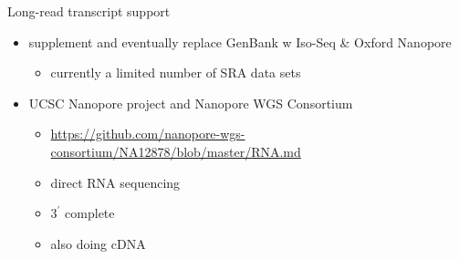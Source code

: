 \documentclass[10pt,
               hyperref={bookmarks=false,
                         bookmarksopen=false,
                         colorlinks=true,
                         linkcolor=blue,
                         urlcolor=blue},
               xcolor={svgnames,table}]{beamer}
\newenvironment{tightitemize}{%
\begin{itemize}
  \setlength{\itemsep}{1pt}%
  \setlength{\parskip}{0pt}%
  \setlength{\parsep}{0pt}%
}{\end{itemize}}
\begin{document}
\begin{frame}{Long-read transcript support}
  \begin{itemize}
  \item supplement and eventually replace GenBank w Iso-Seq \& Oxford Nanopore
    \begin{tightitemize}
    \item currently a limited number of SRA data sets
    \end{tightitemize}
  \item UCSC Nanopore project and Nanopore WGS Consortium
    \begin{tightitemize}
    \item \url{https://github.com/nanopore-wgs-consortium/NA12878/blob/master/RNA.md}
    \item direct RNA sequencing
    \item $3^\prime$ complete
    \item also doing cDNA
    \end{tightitemize}
  \end{itemize}
\end{frame}
\end{document}
